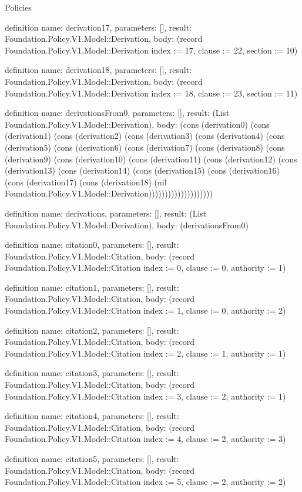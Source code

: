 \begin{lexlean}{Policies}
\begin{semanticmodule}
definition{
  name: derivation17,
  parameters: [],
  result: Foundation.Policy.V1.Model::Derivation,
  body: (record Foundation.Policy.V1.Model::Derivation {index := 17, clause := 22, section := 10})
}

definition{
  name: derivation18,
  parameters: [],
  result: Foundation.Policy.V1.Model::Derivation,
  body: (record Foundation.Policy.V1.Model::Derivation {index := 18, clause := 23, section := 11})
}

definition{
  name: derivationsFrom0,
  parameters: [],
  result: (List Foundation.Policy.V1.Model::Derivation),
  body: (cons (derivation0) (cons (derivation1) (cons (derivation2) (cons (derivation3) (cons (derivation4) (cons (derivation5) (cons (derivation6) (cons (derivation7) (cons (derivation8) (cons (derivation9) (cons (derivation10) (cons (derivation11) (cons (derivation12) (cons (derivation13) (cons (derivation14) (cons (derivation15) (cons (derivation16) (cons (derivation17) (cons (derivation18) (nil Foundation.Policy.V1.Model::Derivation))))))))))))))))))))
}

definition{
  name: derivations,
  parameters: [],
  result: (List Foundation.Policy.V1.Model::Derivation),
  body: (derivationsFrom0)
}

definition{
  name: citation0,
  parameters: [],
  result: Foundation.Policy.V1.Model::Citation,
  body: (record Foundation.Policy.V1.Model::Citation {index := 0, clause := 0, authority := 1})
}

definition{
  name: citation1,
  parameters: [],
  result: Foundation.Policy.V1.Model::Citation,
  body: (record Foundation.Policy.V1.Model::Citation {index := 1, clause := 0, authority := 2})
}

definition{
  name: citation2,
  parameters: [],
  result: Foundation.Policy.V1.Model::Citation,
  body: (record Foundation.Policy.V1.Model::Citation {index := 2, clause := 1, authority := 1})
}

definition{
  name: citation3,
  parameters: [],
  result: Foundation.Policy.V1.Model::Citation,
  body: (record Foundation.Policy.V1.Model::Citation {index := 3, clause := 2, authority := 1})
}

definition{
  name: citation4,
  parameters: [],
  result: Foundation.Policy.V1.Model::Citation,
  body: (record Foundation.Policy.V1.Model::Citation {index := 4, clause := 2, authority := 3})
}

definition{
  name: citation5,
  parameters: [],
  result: Foundation.Policy.V1.Model::Citation,
  body: (record Foundation.Policy.V1.Model::Citation {index := 5, clause := 2, authority := 2})
}


\end{semanticmodule}
\end{lexlean}
